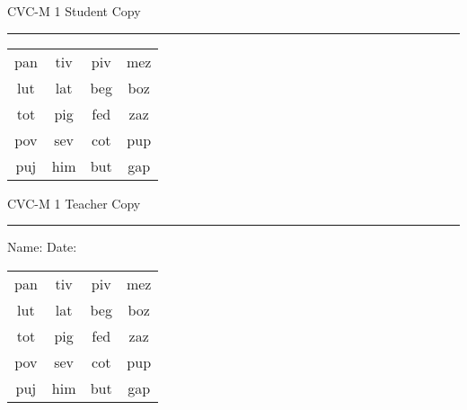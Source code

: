 \documentclass{memoir}
\begin{document}

\footnotesize \noindent
CVC-M 1 \hfill Student Copy
\smallskip
\hrule

\Large

\setlength{\tabcolsep}{14pt}
\def\arraystretch{2}

{\selectfont


\begin{vplace}[0.5]
\begin{center}
\begin{tabular}{cccc}
pan & tiv & piv & mez \\
lut & lat & beg & boz \\
tot & pig & fed & zaz \\
pov & sev & cot & pup \\
puj & him & but & gap \\
\end{tabular}
\end{center}
\end{vplace}

}

\newpage

\footnotesize \noindent
CVC-M 1 \hfill Teacher Copy
\smallskip
\hrule

\small

\vfill

\noindent
Name: \underline{\hspace{1.75in}} \hfill Date: \underline{\hspace{1in}}

\Large

{\selectfont


\begin{vplace}[0.5]
\begin{center}
\begin{tabular}{cccc}
pan & tiv & piv & mez \\
lut & lat & beg & boz \\
tot & pig & fed & zaz \\
pov & sev & cot & pup \\
puj & him & but & gap \\
\end{tabular}
\end{center}
\end{vplace}



}
\end{document}
